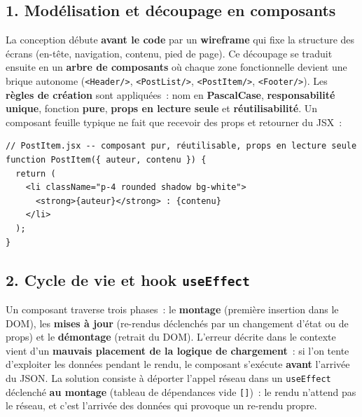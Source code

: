 \vspace{0.4cm}

\subsection*{1. Modélisation et découpage en composants}
{}
\noindent La conception débute \textbf{avant le code} par un \textbf{wireframe} qui fixe la structure des écrans (en-tête, navigation, contenu, pied de page). Ce découpage se traduit ensuite en un \textbf{arbre de composants} où chaque zone fonctionnelle devient une brique autonome (\texttt{<Header/>}, \texttt{<PostList/>}, \texttt{<PostItem/>}, \texttt{<Footer/>}). Les \textbf{règles de création} sont appliquées~: nom en \textbf{PascalCase}, \textbf{responsabilité unique}, fonction \textbf{pure}, \textbf{props en lecture seule} et \textbf{réutilisabilité}. Un composant feuille typique ne fait que recevoir des props et retourner du JSX~:

\begin{verbatim}
// PostItem.jsx -- composant pur, réutilisable, props en lecture seule
function PostItem({ auteur, contenu }) {
  return (
    <li className="p-4 rounded shadow bg-white">
      <strong>{auteur}</strong> : {contenu}
    </li>
  );
}
\end{verbatim}

\vspace{0.3cm}

\subsection*{2. Cycle de vie et hook \texttt{useEffect}}
{}
\noindent Un composant traverse trois phases~: le \textbf{montage} (première insertion dans le DOM), les \textbf{mises à jour} (re-rendus déclenchés par un changement d'état ou de props) et le \textbf{démontage} (retrait du DOM). L'erreur décrite dans le contexte vient d'un \textbf{mauvais placement de la logique de chargement}~: si l'on tente d'exploiter les données pendant le rendu, le composant s'exécute \textbf{avant} l'arrivée du JSON. La solution consiste à déporter l'appel réseau dans un \texttt{useEffect} déclenché \textbf{au montage} (tableau de dépendances vide \texttt{[]})~: le rendu n'attend pas le réseau, et c'est l'arrivée des données qui provoque un re-rendu propre.

